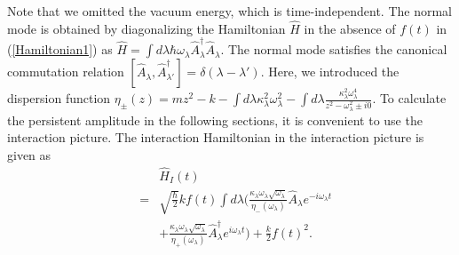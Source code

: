 \documentclass[aps,pre,twocolumn,eqsecnum,showpacs,superscriptaddress]{revtex4}
\begin{document}
Note that we omitted the vacuum energy, which is time-independent.
The normal mode is obtained by diagonalizing the Hamiltonian $\hat{H}$ in the absence of $f(t)$ in (\ref{Hamiltonian1}) as $\hat{H}=\int d\lambda\hbar\omega_\lambda\hat{A}_\lambda^\dagger\hat{A}_\lambda$.
The normal mode satisfies the canonical commutation relation $[\hat{A}_\lambda,\hat{A}_{\lambda'}^\dagger]=\delta(\lambda-\lambda')$.
Here, we introduced the dispersion function $\eta_\pm(z)=mz^2-k-\int d\lambda\kappa_\lambda^2\omega_\lambda^2-\int d\lambda\frac{\kappa_\lambda^2\omega_\lambda^4}{z^2-\omega_\lambda^2\pm i0}$.   
To calculate the persistent amplitude in the following sections, it is convenient to use the interaction picture.
The interaction Hamiltonian in the interaction picture is given as
\begin{eqnarray}
&&\hat{H}_I(t) \nonumber \\
&=&\sqrt{\frac{\hbar}{2}}kf(t)\int d\lambda(\frac{\kappa_\lambda\omega_\lambda\sqrt{\omega_\lambda}}{\eta_-(\omega_\lambda)}\hat{A}_\lambda e^{-i\omega_\lambda t} \nonumber \\
&&+\frac{\kappa_\lambda\omega_\lambda\sqrt{\omega_\lambda}}{\eta_+(\omega_\lambda)}\hat{A}_\lambda^\dagger e^{i\omega_\lambda t})+\frac{k}{2}f(t)^2. \label{Interaction1}
\end{eqnarray}
\end{document}
